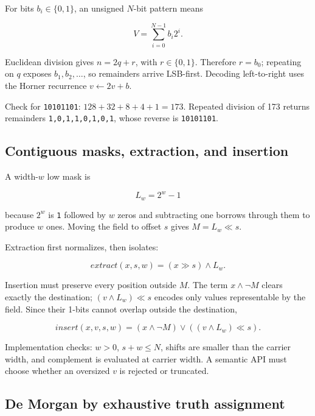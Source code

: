 For bits \(b_i\in\{0,1\}\), an unsigned \(N\)-bit pattern means

\[
V=\sum_{i=0}^{N-1}b_i2^i.
\]

Euclidean division gives \(n=2q+r\), with \(r\in\{0,1\}\). Therefore \(r=b_0\); repeating on \(q\) exposes \(b_1,b_2,\ldots\), so remainders arrive LSB-first. Decoding left-to-right uses the Horner recurrence \(v\leftarrow2v+b\).

Check for \texttt{10101101}: \(128+32+8+4+1=173\). Repeated division of 173 returns remainders \texttt{1,0,1,1,0,1,0,1}, whose reverse is \texttt{10101101}.

\subsection{Contiguous masks, extraction, and insertion}\label{01-foundations-i-ch011-contiguous-masks-extraction-and-insertion}

\hypertarget{01-foundations-i-ch011-contiguous-masks-extraction-and-insertion}{}

A width-\(w\) low mask is

\[
L_w=2^w-1
\]

because \(2^w\) is \texttt{1} followed by \(w\) zeros and subtracting one borrows through them to produce \(w\) ones. Moving the field to offset \(s\) gives \(M=L_w\ll s\).

Extraction first normalizes, then isolates:

\[
extract(x,s,w)=(x\gg s)\land L_w.
\]

Insertion must preserve every position outside \(M\). The term \(x\land\neg M\) clears exactly the destination; \((v\land L_w)\ll s\) encodes only values representable by the field. Since their 1-bits cannot overlap outside the destination,

\[
insert(x,v,s,w)=(x\land\neg M)\lor((v\land L_w)\ll s).
\]

Implementation checks: \(w>0\), \(s+w\le N\), shifts are smaller than the carrier width, and complement is evaluated at carrier width. A semantic API must choose whether an oversized \(v\) is rejected or truncated.

\subsection{De Morgan by exhaustive truth assignment}\label{01-foundations-i-ch011-de-morgan-by-exhaustive-truth-assignment}

\hypertarget{01-foundations-i-ch011-de-morgan-by-exhaustive-truth-assignment}{}

